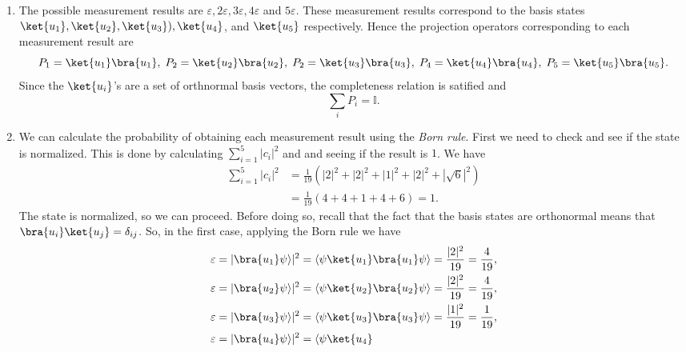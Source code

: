 \begin{footnotesize}\begin{solution}
\begin{enumerate}
 \item The possible measurement results are $\varepsilon, 2\varepsilon,
3\varepsilon, 4\varepsilon$ and $5\varepsilon$. These measurement results
correspond to the basis states $\ket{u_1},\ket{u_2},\ket{u_3}),\ket{u_4}$, and
$\ket{u_5}$ respectively. Hence the projection operators corresponding to each
measurement result are
\begin{equation}
 P_1=\ket{u_1}\bra{u_1},\; P_2=\ket{u_2}\bra{u_2},\; P_2=\ket{u_3}\bra{u_3},\;
P_4=\ket{u_4}\bra{u_4},\; P_5=\ket{u_5}\bra{u_5}.
\end{equation}
Since the $\ket{u_i}$'s are a set of orthnormal basis vectors, the completeness
relation is satified and
\begin{equation}
\sum_{i}P_i = \mathbb{I}.
\end{equation}
\item We can calculate the probability of obtaining each measurement result
using the \emph{Born rule}. First we need to check and see if the state
is normalized. This is done by calculating $\sum_{i=1}^{5}|c_i|^{2}$ and and
seeing if the result is $1$. We have
\begin{equation}
\begin{split}
 \sum_{i=1}^{5}|c_i|^{2} & =\frac{1}{19}(|2|^2 +|2|^2 +|1|^2 +|2|^2 +|\sqrt{6}|
^2)\\
  & = \frac{1}{19}(4+4+1+4+6)=1.
\end{split}
\end{equation}
The state is normalized, so we can proceed. Before doing so, recall that the
fact that the basis states are orthonormal means that $\bra{u_i}\ket{u_j}
=\delta_{ij}$. So, in the first case, applying the Born rule we have
\begin{subequations}
\begin{align}
 \mathcal{\varepsilon}&=|\bra{u_1}\psi\rangle|^{2}=\langle\psi\ket{u_1}
\bra{u_1}\psi\rangle=\frac{|2|^2}{19}=\frac{4}{19},\\
 \mathcal{\varepsilon}& =|\bra{u_2}\psi\rangle|^{2}=\langle\psi\ket{u_2}
\bra{u_2}\psi\rangle=\frac{|2|^2}{19}=\frac{4}{19},\\
 \mathcal{\varepsilon}&=|\bra{u_3}\psi\rangle|^{2}=\langle\psi\ket{u_3}
 \bra{u_3}\psi\rangle=\frac{|1|^2}{19}=\frac{1}{19},\\
 \mathcal{\varepsilon}&=|\bra{u_4}\psi\rangle|^{2}=\langle\psi\ket{u_4}

\end{align}
\end{subequations}
\end{enumerate}
\end{solution}
\end{footnotesize}
